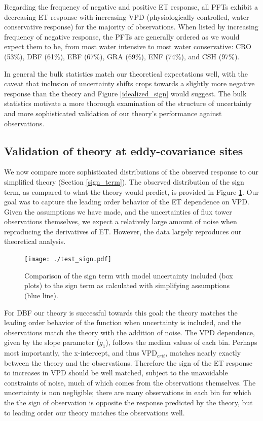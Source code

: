 \documentclass[draft,linenumbers]{gcbjournal}
\begin{document}
Regarding the frequency of negative and positive ET response, all PFTs exhibit a  decreasing ET response with increasing VPD (physiologically controlled, water conservative response) for the majority of observations. When listed by increasing frequency of negative response, the PFTs are generally ordered as we would expect them to be, from most water intensive to most water conservative: CRO (53\%), DBF (61\%), EBF (67\%), GRA (69\%), ENF (74\%), and CSH (97\%). 

In general the bulk statistics match our theoretical expectations well, with the caveat that inclusion of uncertainty shifts crops towards a slightly more negative response than the theory and Figure \ref{idealized_sign} would suggest. The bulk statistics motivate a more thorough examination of the structure of uncertainty and more sophisticated validation of our theory's performance against observations. 

\subsection{Validation of theory at eddy-covariance sites}
\label{testing}
We now compare more sophisticated distributions of the observed response to our simplified theory (Section \ref{sign_term}). The observed distribution of the sign term, as compared to what the theory would predict, is provided in Figure \ref{test_sign}. Our goal was to capture the leading order behavior of the ET dependence on VPD. Given the assumptions we have made, and the uncertainties of flux tower observations themselves, we expect a relatively large amount of noise when reproducing the derivatives of ET. However, the data largely reproduces our theoretical analysis.

\begin{figure}
\centering
\texttt{[image: ./test\_sign.pdf]}
\caption{Comparison of the sign term with model uncertainty included (box plots) to the sign term as calculated with simplifying assumptions (blue line).}
\label{test_sign}
\end{figure}

For DBF our theory is successful towards this goal: the theory matches the leading order behavior of the function when uncertainty is included, and the observations match the theory with the addition of noise. The VPD dependence, given by the slope parameter ($g_1$), follows the median values of each bin. Perhaps most importantly, the x-intercept, and thus VPD$_{crit}$, matches nearly exactly between the theory and the observations. Therefore the sign of the ET response to increases in VPD should be well matched, subject to the unavoidable constraints of noise, much of which comes from the observations themselves. The uncertainty is non negligible; there are many observations in each bin for which the the sign of observation is opposite the response predicted by the theory, but to leading order our theory matches the observations well.
\end{document}
